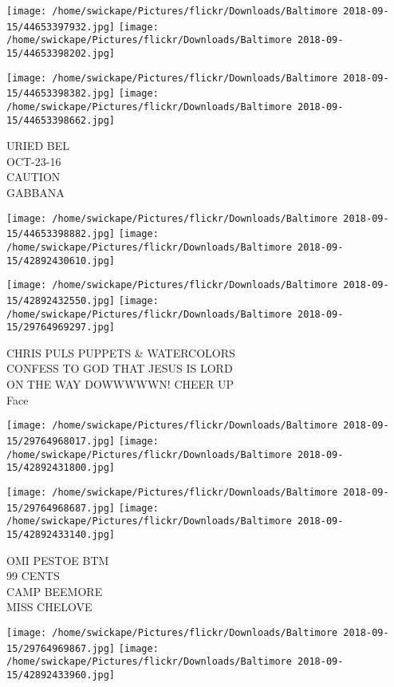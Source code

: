\documentclass[10pt,letterpaper]{article}
\begin{document}
\texttt{[image: /home/swickape/Pictures/flickr/Downloads/Baltimore 2018-09-15/44653397932.jpg]}
\texttt{[image: /home/swickape/Pictures/flickr/Downloads/Baltimore 2018-09-15/44653398202.jpg]}

\texttt{[image: /home/swickape/Pictures/flickr/Downloads/Baltimore 2018-09-15/44653398382.jpg]}
\texttt{[image: /home/swickape/Pictures/flickr/Downloads/Baltimore 2018-09-15/44653398662.jpg]}

URIED BEL\\
OCT{-}23{-}16\\
CAUTION\\
GABBANA\\
\pagebreak

\texttt{[image: /home/swickape/Pictures/flickr/Downloads/Baltimore 2018-09-15/44653398882.jpg]}
\texttt{[image: /home/swickape/Pictures/flickr/Downloads/Baltimore 2018-09-15/42892430610.jpg]}

\texttt{[image: /home/swickape/Pictures/flickr/Downloads/Baltimore 2018-09-15/42892432550.jpg]}
\texttt{[image: /home/swickape/Pictures/flickr/Downloads/Baltimore 2018-09-15/29764969297.jpg]}

CHRIS PULS PUPPETS \& WATERCOLORS\\
CONFESS TO GOD THAT JESUS IS LORD\\
ON THE WAY DOWWWWWN!  CHEER UP\\
Face\\
\pagebreak

\texttt{[image: /home/swickape/Pictures/flickr/Downloads/Baltimore 2018-09-15/29764968017.jpg]}
\texttt{[image: /home/swickape/Pictures/flickr/Downloads/Baltimore 2018-09-15/42892431800.jpg]}

\texttt{[image: /home/swickape/Pictures/flickr/Downloads/Baltimore 2018-09-15/29764968687.jpg]}
\texttt{[image: /home/swickape/Pictures/flickr/Downloads/Baltimore 2018-09-15/42892433140.jpg]}

OMI PESTOE BTM\\
99 CENTS\\
CAMP BEEMORE\\
MISS CHELOVE\\
\pagebreak

\texttt{[image: /home/swickape/Pictures/flickr/Downloads/Baltimore 2018-09-15/29764969867.jpg]}
\texttt{[image: /home/swickape/Pictures/flickr/Downloads/Baltimore 2018-09-15/42892433960.jpg]}
\end{document}
